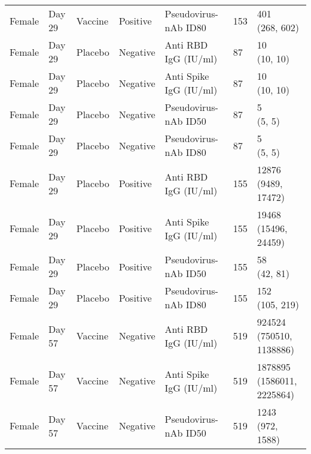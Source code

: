 \documentclass[]{book}
\theoremstyle{definition}
\theoremstyle{definition}
\theoremstyle{definition}
\newcommand{\1}{\mathbbm{1}}
\begin{document}
\begin{landscape}
\begin{ThreePartTable}
\begin{longtable}[t]{>{\raggedright\arraybackslash}p{7cm}llllll}
\hspace{1em}Female & Day 29 & Vaccine & Positive & Pseudovirus-nAb ID80 & 153 & \makecell[l]{401\\(268, 602)}\\
\hspace{1em}Female & Day 29 & Placebo & Negative & Anti RBD IgG (IU/ml) & 87 & \makecell[l]{10\\(10, 10)}\\
\hspace{1em}Female & Day 29 & Placebo & Negative & Anti Spike IgG (IU/ml) & 87 & \makecell[l]{10\\(10, 10)}\\
\hspace{1em}Female & Day 29 & Placebo & Negative & Pseudovirus-nAb ID50 & 87 & \makecell[l]{5\\(5, 5)}\\
\hspace{1em}Female & Day 29 & Placebo & Negative & Pseudovirus-nAb ID80 & 87 & \makecell[l]{5\\(5, 5)}\\
\hspace{1em}Female & Day 29 & Placebo & Positive & Anti RBD IgG (IU/ml) & 155 & \makecell[l]{12876\\(9489, 17472)}\\
\hspace{1em}Female & Day 29 & Placebo & Positive & Anti Spike IgG (IU/ml) & 155 & \makecell[l]{19468\\(15496, 24459)}\\
\hspace{1em}Female & Day 29 & Placebo & Positive & Pseudovirus-nAb ID50 & 155 & \makecell[l]{58\\(42, 81)}\\
\hspace{1em}Female & Day 29 & Placebo & Positive & Pseudovirus-nAb ID80 & 155 & \makecell[l]{152\\(105, 219)}\\
\hspace{1em}Female & Day 57 & Vaccine & Negative & Anti RBD IgG (IU/ml) & 519 & \makecell[l]{924524\\(750510, 1138886)}\\
\hspace{1em}Female & Day 57 & Vaccine & Negative & Anti Spike IgG (IU/ml) & 519 & \makecell[l]{1878895\\(1586011, 2225864)}\\
\hspace{1em}Female & Day 57 & Vaccine & Negative & Pseudovirus-nAb ID50 & 519 & \makecell[l]{1243\\(972, 1588)}\\

\end{longtable}
\end{ThreePartTable}
\end{landscape}
\end{document}
